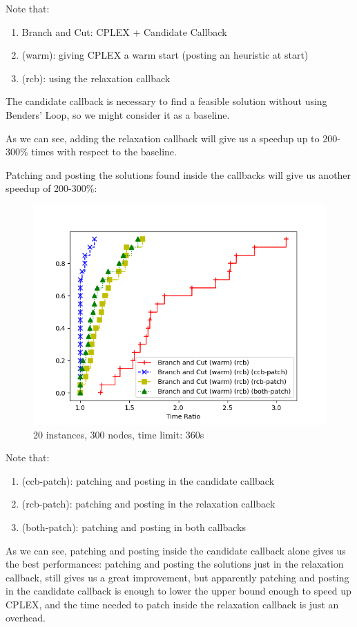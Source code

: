 Note that:
\begin{enumerate}
    \item[] Branch and Cut: CPLEX + Candidate Callback
    \item[] (warm): giving CPLEX a warm start (posting an heuristic at start)
    \item[] (rcb): using the relaxation callback
\end{enumerate}

The candidate callback is necessary to find a feasible solution without using Benders' Loop, so we might consider it as a baseline.

As we can see, adding the relaxation callback will give us a speedup up to 200-300\% times with respect to the baseline.

Patching and posting the solutions found inside the callbacks will give us another speedup of 200-300\%:

\FloatBarrier
\begin{figure}[h]
    \centering
    \includegraphics*[width=.6\textwidth]{../plots/perfprof_bnc_patch_times.png}
    \caption*{20 instances, 300 nodes, time limit: 360s}
\end{figure}
\FloatBarrier

Note that:
\begin{enumerate}
    \item (ccb-patch): patching and posting in the candidate callback
    \item (rcb-patch): patching and posting in the relaxation callback
    \item (both-patch): patching and posting in both callbacks
\end{enumerate}

As we can see, patching and posting inside the candidate callback alone gives us the best performances: patching and posting the solutions just in the relaxation callback, still gives us a great improvement, but apparently patching and posting in the candidate callback is enough to lower the upper bound enough to speed up CPLEX, and the time needed to patch inside the relaxation callback is just an overhead.

